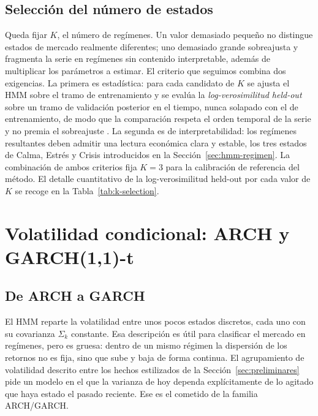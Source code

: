\subsection{Selección del número de estados}
\label{sec:hmm-K}

Queda fijar $K$, el número de regímenes. Un valor demasiado pequeño no distingue estados de mercado realmente diferentes; uno demasiado grande sobreajusta y fragmenta la serie en regímenes sin contenido interpretable, además de multiplicar los parámetros a estimar. El criterio que seguimos combina dos exigencias. La primera es estadística: para cada candidato de $K$ se ajusta el HMM sobre el tramo de entrenamiento y se evalúa la \emph{log-verosimilitud held-out} sobre un tramo de validación posterior en el tiempo, nunca solapado con el de entrenamiento, de modo que la comparación respeta el orden temporal de la serie y no premia el sobreajuste \cite{rabiner1989}. La segunda es de interpretabilidad: los regímenes resultantes deben admitir una lectura económica clara y estable, los tres estados de Calma, Estrés y Crisis introducidos en la Sección~\ref{sec:hmm-regimen}. La combinación de ambos criterios fija $K = 3$ para la calibración de referencia del método. El detalle cuantitativo de la log-verosimilitud held-out por cada valor de $K$ se recoge en la Tabla~\ref{tab:k-selection}.


\section{Volatilidad condicional: ARCH y GARCH(1,1)-t}
\label{sec:garch}

\subsection{De ARCH a GARCH}
\label{sec:garch-arch}

El HMM reparte la volatilidad entre unos pocos estados discretos, cada uno con su covarianza $\Sigma_k$ constante. Esa descripción es útil para clasificar el mercado en regímenes, pero es gruesa: dentro de un mismo régimen la dispersión de los retornos no es fija, sino que sube y baja de forma continua. El agrupamiento de volatilidad descrito entre los hechos estilizados de la Sección~\ref{sec:preliminares} pide un modelo en el que la varianza de hoy dependa explícitamente de lo agitado que haya estado el pasado reciente. Ese es el cometido de la familia ARCH/GARCH.

